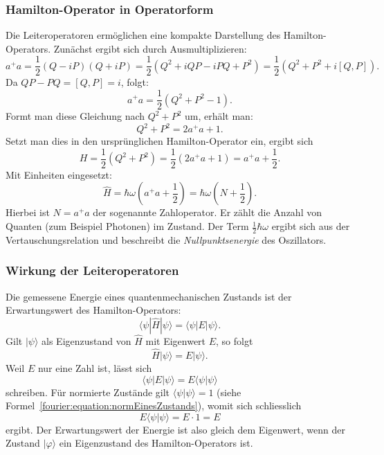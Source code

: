 		\subsubsection{Hamilton-Operator in Operatorform\label{fourier:subsubsection:HamiltonOperatorInOperatorform}}
			Die Leiteroperatoren ermöglichen eine kompakte Darstellung des Hamilton-Operators.
			Zunächst ergibt sich durch Ausmultiplizieren:
			\[
				a^+a = \frac{1}{2}(Q - iP)(Q + iP) = \frac{1}{2}(Q^2 + iQP - iPQ + P^2) = \frac{1}{2}(Q^2 + P^2 + i[Q, P]).
			\]
			Da $QP - PQ = [Q, P] = i$, folgt:
			\[
				a^+a = \frac{1}{2}(Q^2 + P^2 - 1).
			\]
			Formt man diese Gleichung nach $Q^2 + P^2$ um, erhält man:
			\[
				Q^2 + P^2 = 2a^+a + 1.
			\]
			Setzt man dies in den ursprünglichen Hamilton-Operator ein, ergibt sich
			\[
				H = \frac{1}{2}(Q^2 + P^2) = \frac{1}{2}(2a^+a + 1) = a^+a + \frac{1}{2}.
			\]
			Mit Einheiten eingesetzt:
			\begin{equation}
				\hat{H} = \hbar\omega \left(a^+ a + \frac{1}{2}\right) = \hbar\omega \left(N + \frac{1}{2}\right).
			\end{equation}
			Hierbei ist $N = a^+a$ der sogenannte Zahloperator.
			Er zählt die Anzahl von Quanten (zum Beispiel Photonen) im Zustand.
			Der Term $\frac{1}{2}\hbar\omega$ ergibt sich aus der Vertauschungsrelation und beschreibt die \emph{Nullpunktsenergie} des Oszillators.
		
		\subsubsection{Wirkung der Leiteroperatoren\label{fourier:subsubsection:WirkungLeiteroperatoren}}
			Die gemessene Energie eines quantenmechanischen Zustands ist der Erwartungswert des Hamilton-Operators:
			\begin{equation}
				\langle\psi|\hat{H}|\psi\rangle = \langle\psi|E|\psi\rangle.
			\end{equation}
			Gilt $|\psi\rangle$ als Eigenzustand von $\hat{H}$ mit Eigenwert $E$, so folgt
			\begin{equation}
				\hat{H}|\psi\rangle = E|\psi\rangle.
			\end{equation}
			Weil $E$ nur eine Zahl ist, lässt sich
			\[
				\langle\psi|E|\psi\rangle = E \langle\psi|\psi\rangle
			\]
			schreiben.
			Für normierte Zustände gilt $\langle\psi|\psi\rangle = 1$ (siehe Formel~\ref{fourier:equation:normEinesZustands}), womit sich schliesslich
			\[
				E \langle\psi|\psi\rangle = E \cdot 1 = E
			\]
			ergibt.
			Der Erwartungswert der Energie ist also gleich dem Eigenwert, wenn der Zustand $|\varphi\rangle$ ein Eigenzustand des Hamilton-Operators ist.

